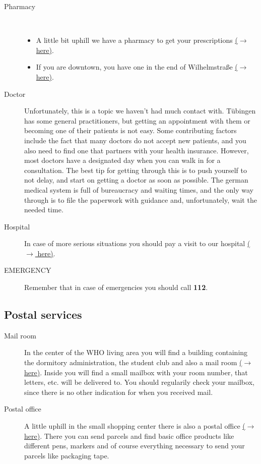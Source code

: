 \begin{description}
    \item[Pharmacy] \ \
        \begin{itemize}
            \item A little bit uphill we have a pharmacy to get your prescriptions \href{https://maps.app.goo.gl/cpDLc9VZ7XukpgS18}{($\xrightarrow{}$ here)}.
            \item If you are downtown, you have one in the end of Wilhelmstraße \href{https://maps.app.goo.gl/YXwvVpp81eTSZeJW7}{($\xrightarrow{}$ here)}.
        \end{itemize}
  
    \item[Doctor]
     Unfortunately, this is a topic we haven’t had much contact with. Tübingen has some general practitioners, but getting an appointment with them or becoming one of their patients is not easy. Some contributing factors include the fact that many doctors do not accept new patients, and you also need to find one that partners with your health insurance. However, most doctors have a designated day when you can walk in for a consultation. The best tip for getting through this is to push yourself to not delay, and start on getting a doctor as soon as possible. The german medical system is full of bureaucracy and waiting times, and the only way through is to file the paperwork with guidance and, unfortunately, wait the needed time.
   
    \item[Hospital]
    In case of more serious situations you should pay a visit to our hospital \href{https://maps.app.goo.gl/EHyduztd2QgxTVer9}{($\xrightarrow{}$ here)}.

    \item[EMERGENCY]
    Remember that in case of emergencies you should call \textbf{112}.
\end{description}

\subsection{Postal services}
\begin{description}
    \item[Mail room]
    In the center of the WHO living area you will find a building containing the dormitory administration, the student club  and also a mail room \href{https://maps.app.goo.gl/W9UtqfhE1LJJ5oGH8}{($\xrightarrow{}$ here)}. Inside you will find a small mailbox with your room number, that letters, etc. will be delivered to. You should regularily check your mailbox, since there is no other indication for when you received mail.

    \item[Postal office]
    A little uphill in the small  shopping center there is also a postal office \href{https://maps.app.goo.gl/nMnEheHexNQ5NZY37}{($\xrightarrow{}$ here)}. There you can send parcels and find basic office products like different pens, markers and of course everything necessary to send your parcels like packaging tape.
\end{description}

